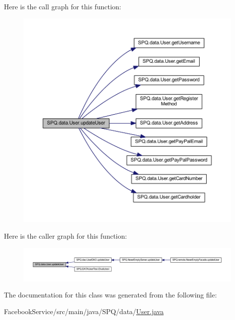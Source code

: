Here is the call graph for this function\+:
\nopagebreak
\begin{figure}[H]
\begin{center}
\leavevmode
\includegraphics[width=350pt]{class_s_p_q_1_1data_1_1_user_ac472400b9deed770cf6f3591dc9e2886_cgraph}
\end{center}
\end{figure}
Here is the caller graph for this function\+:
\nopagebreak
\begin{figure}[H]
\begin{center}
\leavevmode
\includegraphics[width=350pt]{class_s_p_q_1_1data_1_1_user_ac472400b9deed770cf6f3591dc9e2886_icgraph}
\end{center}
\end{figure}


The documentation for this class was generated from the following file\+:\begin{DoxyCompactItemize}
\item 
Facebook\+Service/src/main/java/\+S\+P\+Q/data/\mbox{\hyperlink{_facebook_service_2src_2main_2java_2_s_p_q_2data_2_user_8java}{User.\+java}}\end{DoxyCompactItemize}
